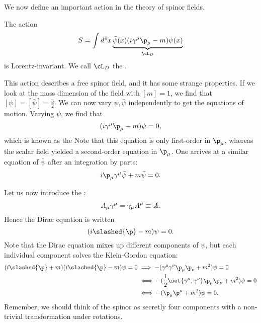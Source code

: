 We now define an important action in the theory of spinor fields.
\begin{claim}
    The action
    \begin{equation}
        S=\int d^4x \underbrace{\bar \psi(x)(i \gamma^\mu \p_\mu -m)\psi(x)}_{\cL_D}
    \end{equation}
    is Lorentz-invariant. We call $\cL_D$ the .
\end{claim}
This action describes a free spinor field, and it has some strange properties. If we look at the mass dimension of the field with $[m]=1$, we find that $[\psi]=[\bar\psi]=\frac{3}{2}$. We can now vary $\psi,\bar\psi$ independently to get the equations of motion. Varying $\psi$, we find that
$$(i\gamma^\mu \p_\mu -m)\psi=0,$$
which is known as the  Note that this equation is only first-order in $\p_\mu$, whereas the scalar field yielded a second-order equation in $\p_\mu$. One arrives at a similar equation of $\bar \psi$ after an integration by parts:
$$i\p_\mu \gamma^\mu \bar \psi + m \bar \psi=0.$$

Let us now introduce the :
$$A_\mu \gamma^\mu = \gamma_\mu A^\mu \equiv \slashed{A}.$$
Hence the Dirac equation is written
$$(i\slashed{\p}-m)\psi=0.$$
Note that the Dirac equation mixes up different components of $\psi$, but each individual component solves the Klein-Gordon equation:
\begin{align*}
    (i\slashed{\p}+m)(i\slashed{\p}-m)\psi=0
    &\implies -(\gamma^\mu \gamma^\nu \p_\mu \p_\nu +m^2)\psi=0\\
    &\iff -(\frac{1}{2}\set{\gamma^\mu, \gamma^\nu}\p_\mu \p_\nu +m^2)\psi =0\\
    &\iff -(\p_\mu \p^\mu+m^2)\psi =0.
\end{align*}
Remember, we should think of the spinor as secretly four components with a non-trivial transformation under rotations.

